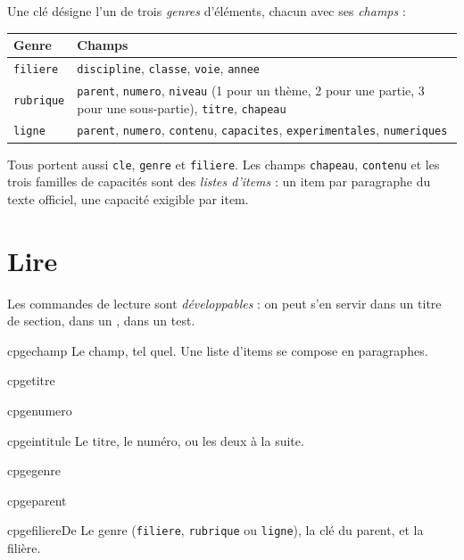 \documentclass[a4paper,11pt]{article}
\newcommand\cle[1]{\texttt{#1}}
\newcommand\champ[1]{\texttt{#1}}
\begin{document}
Une clé désigne l'un de trois \emph{genres} d'éléments, chacun avec ses
\emph{champs} :

\begin{center}
\begin{tabularx}{\linewidth}{@{}lX@{}}
  \toprule
  Genre & Champs \\
  \midrule
  \cle{filiere} & \champ{discipline}, \champ{classe}, \champ{voie}, \champ{annee} \\
  \cle{rubrique} & \champ{parent}, \champ{numero}, \champ{niveau} (1 pour un thème,
    2 pour une partie, 3 pour une sous-partie), \champ{titre}, \champ{chapeau} \\
  \cle{ligne} & \champ{parent}, \champ{numero}, \champ{contenu}, \champ{capacites},
    \champ{experimentales}, \champ{numeriques} \\
  \bottomrule
\end{tabularx}
\end{center}

Tous portent aussi \champ{cle}, \champ{genre} et \champ{filiere}. Les champs
\champ{chapeau}, \champ{contenu} et les trois familles de capacités sont des
\emph{listes d'items} : un item par paragraphe du texte officiel, une capacité
exigible par item.

\section{Lire}

Les commandes de lecture sont \emph{développables} : on peut s'en servir dans un
titre de section, dans un , dans un test.

\begin{docCommand}{cpgechamp}{}
  Le champ, tel quel. Une liste d'items se compose en paragraphes.
\end{docCommand}

\begin{docCommand}{cpgetitre}{}\end{docCommand}
\begin{docCommand}{cpgenumero}{}\end{docCommand}
\begin{docCommand}{cpgeintitule}{}
  Le titre, le numéro, ou les deux à la suite.
\end{docCommand}

\begin{docCommand}{cpgegenre}{}\end{docCommand}
\begin{docCommand}{cpgeparent}{}\end{docCommand}
\begin{docCommand}{cpgefiliereDe}{}
  Le genre (\cle{filiere}, \cle{rubrique} ou \cle{ligne}), la clé du parent, et
  la filière.
\end{docCommand}
\end{document}
